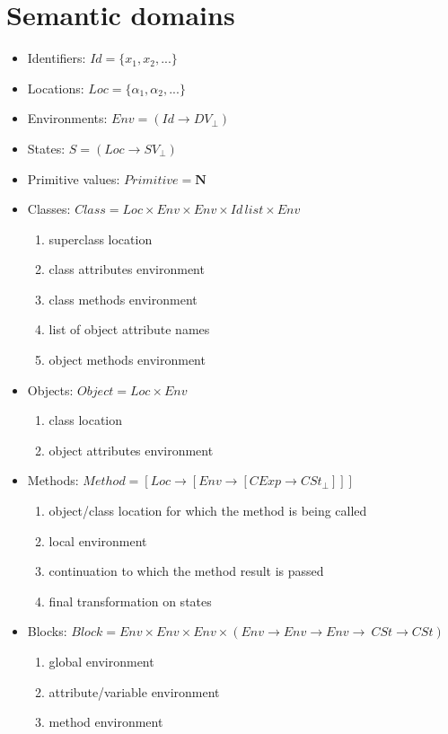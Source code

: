 \documentclass[11pt,a4paper,twoside]{article}
\begin{document}
\section{Semantic domains}
\begin{itemize}
\item Identifiers: $Id = \{x_{1}, x_{2}, ...\}$
\item Locations: $Loc = \{\alpha_{1}, \alpha_{2}, ...\}$
\item Environments: $Env = (Id\rightarrow DV_{\bot})$
\item States: $S = (Loc\rightarrow SV_{\bot})$
\item Primitive values: $Primitive = \textbf{N}$
\item Classes: $Class = Loc\times Env\times Env\times Id\,list\times Env$
\begin{enumerate}
\item superclass location
\item class attributes environment
\item class methods environment
\item list of object attribute names
\item object methods environment
\end{enumerate}
\item Objects: $Object = Loc\times Env$
\begin{enumerate}
\item class location
\item object attributes environment
\end{enumerate}
\item Methods: $Method = [Loc\rightarrow [Env\rightarrow [CExp\rightarrow CSt_{\bot}]]]$
\begin{enumerate}
\item object/class location for which the method is being called
\item local environment
\item continuation to which the method result is passed
\item final transformation on states
\end{enumerate}
\item Blocks: $Block = Env\times Env\times Env\times (Env\rightarrow Env\rightarrow Env\rightarrow\ CSt\rightarrow CSt)$
\begin{enumerate}
\item global environment
\item attribute/variable environment
\item method environment

\end{enumerate}
\end{itemize}
\end{document}
